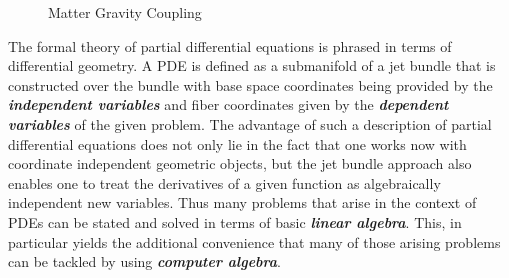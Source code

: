 \begin{figure}[hbt!]
\centering 
{}
\caption{Matter Gravity Coupling}\label{MatterGrav}
\end{figure}

The formal theory of partial differential equations is phrased in terms of differential geometry. A PDE is defined as a submanifold of a jet bundle that is constructed over the bundle with base space coordinates being provided by the \textit{\textbf{independent variables}} and fiber coordinates given by the \textit{\textbf{dependent variables}} of the given problem. The advantage of such a description of partial differential equations does not only lie in the fact that one works now with coordinate independent geometric objects, but the jet bundle approach also enables one to treat the derivatives of a given function as algebraically independent new variables. Thus many problems that arise in the context of PDEs can be stated and solved in terms of basic \textit{\textbf{linear algebra}}. This, in particular yields the additional convenience that many of those arising problems can be tackled by using \textbf{\textit{computer algebra}}.

